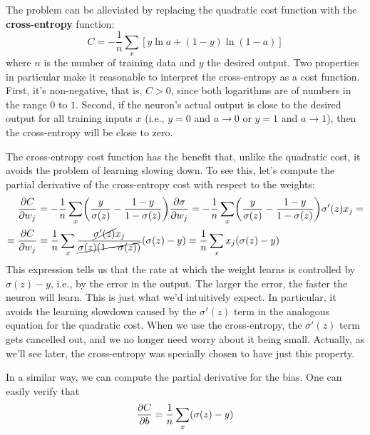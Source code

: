 \documentclass[12pt, letterpaper]{article}
\theoremstyle{definition}
\DeclarePairedDelimiter\autobracket{(}{)}
\newcommand{\br}[1]{\autobracket*{#1}}
\let\tb\textbf
\begin{document}
The problem can be alleviated by replacing the quadratic cost function with the \tb{cross-entropy} function:
\begin{equation}
C =- \frac{1}{n} \sum_x \left[ y \ln a + (1-y) \ln(1-a)\right]
\end{equation}
where $n$ is the number of training data and $y$ the desired output. Two properties in particular make it reasonable to interpret the cross-entropy as a cost function. First, it's non-negative, that is, $C>0$,  since both logarithms are of numbers in the range $0$ to $1$. Second, if the neuron's actual output is close to the desired output for all training inputs $x$ (i.e., $y=0$ and $a\rightarrow 0$ or $y=1$ and $a\rightarrow 1$), then the cross-entropy will be close to zero.

The cross-entropy cost function has the benefit that, unlike the quadratic cost, it avoids the problem of learning slowing down. To see this, let's compute the partial derivative of the cross-entropy cost with respect to the weights:
\begin{equation}
\begin{aligned}
\frac{\partial C}{\partial w_j} &= - \frac{1}{n} \sum_x \br{ \frac{y}{\sigma(z)} -\frac{1-y}{1-\sigma(z)}} \frac{\partial\sigma}{\partial w_j} =  - \frac{1}{n} \sum_x \br{ \frac{y}{\sigma(z)} -\frac{1-y}{1-\sigma(z)}} \sigma'(z) x_j =\\
= \frac{\partial C}{\partial w_j} &= \frac{1}{n} \sum_x\frac{\cancel{\sigma'(z)} x_j}{\cancel{\sigma(z)\br{1-\sigma(z)}}}\br{\sigma(z) - y} = \frac{1}{n} \sum_x x_j \br{\sigma(z) - y}
\end{aligned} 
\end{equation}
This expression tells us that the rate at which the weight learns is controlled by $\sigma(z)-y$, i.e., by the error in the output. The larger the error, the faster the neuron will learn. This is just what we'd intuitively expect. In particular, it avoids the learning slowdown caused by the $\sigma'(z)$ term in the analogous equation for the quadratic cost. When we use the cross-entropy, the $\sigma'(z)$ term gets cancelled out, and we no longer need worry about it being small. Actually, as we'll see later, the cross-entropy was specially chosen to have just this property.

In a similar way, we can compute the partial derivative for the bias. One can easily verify that
\begin{equation}
\frac{\partial C}{\partial b} = \frac{1}{n} \sum_x \br{\sigma(z)-y}
\end{equation}
\end{document}
